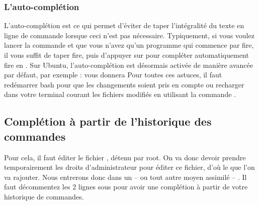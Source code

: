 \subsubsection{L'auto-complétion}
L'auto-complétion est ce qui permet d'éviter de taper l'intégralité du texte en ligne de commande lorsque ceci n'est pas nécessaire. Typiquement, si vous voulez lancer la commande  et que vous n'avez qu'un programme qui commence par fire, il vous suffit de taper fire, puis d'appuyer sur  pour compléter automatiquement fire en .
Sur Ubuntu, l'auto-complétion est désormais activée de manière avancée par défaut, par exemple :
vous donnera
Pour toutes ces astuces, il faut redémarrer bash pour que les changements soient pris en compte ou recharger dans votre terminal courant les fichiers modifiés en utilisant la commande .
\subsection{Complétion à partir de l'historique des commandes}
Pour cela, il faut éditer le fichier , détenu par root. On va donc devoir prendre temporairement les droits d'administrateur pour éditer ce fichier, d'où le  que l'on va rajouter.
Nous entrerons donc dans un  -- ou tout autre moyen assimilé -- . Il faut décommentez les 2 lignes sous
pour avoir une complétion à partir de votre historique de commandes.
